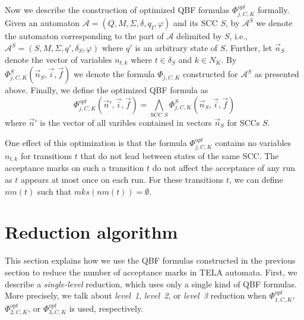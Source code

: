 \documentclass[a4paper,UKenglish,cleveref,autoref,thm-restate]{lipics-v2021}
\newcommand{\mks}{\mathit{mks}}
\newcommand{\rem}{\mathit{nm}}
\newcommand{\mA}{\mathcal{A}}
\begin{document}
Now we describe the construction of optimized QBF formulas
$\Phi^\mathit{opt}_{j,C,K}$ formally. Given an automaton
$\mA=(Q,M,\Sigma,\delta,q_I,\varphi)$ and its SCC $S$, by $\mA^S$ we
denote the automaton corresponding to the part of $\mA$ delimited by
$S$, i.e., $\mA^S=(S,M,\Sigma,q',\delta_S,\varphi)$ where $q'$ is an
arbitrary state of $S$. Further, let $\vec{n}_S$ denote the vector of
variables $n_{t,k}$ where $t\in\delta_S$ and $k\in N_K$. By
$\Phi^S_{j,C,K}(\vec{n}_S,\vec{i},\vec{f})$ we denote the formula
$\Phi_{j,C,K}$ constructed for $\mA^S$ as presented above.
Finally, we define the optimized QBF formula as
\[
  \Phi^\mathit{opt}_{j,C,K}(\vec{n}',\vec{i},\vec{f})=\bigwedge_{\textrm{SCC }S}\Phi^S_{j,C,K}(\vec{n}_S,\vec{i},\vec{f})
\]
where $\vec{n}'$ is the vector of all varibles contained in vectors
$\vec{n}_S$ for SCCs $S$.

One effect of this optimization is that the formula
$\Phi^\mathit{opt}_{j,C,K}$ contains no variables $n_{t,k}$ %
for transitions $t$ that do not lead between states of the same SCC.
The acceptance marks on such a transition $t$ do not affect the
acceptance of any run as $t$ appears at most once on each run. For
these transitions $t$, we can define $\rem(t)$ such that
$\mks(\rem(t))=\emptyset$.


\section{Reduction algorithm}\label{sec:algo}

This section explains how we use the QBF formulas constructed in the
previous section to reduce the number of acceptance marks in TELA
automata. First, we describe a \emph{single-level} reduction, which
uses only a single kind of QBF formulas. More precisely, we talk about
\emph{level~1}, \emph{level~2}, or \emph{level~3} reduction when
$\Phi^\mathit{opt}_{1,C,K}$, $\Phi^\mathit{opt}_{2,C,K}$, or
$\Phi^\mathit{opt}_{3,C,K}$ is used, respectively.
\end{document}
